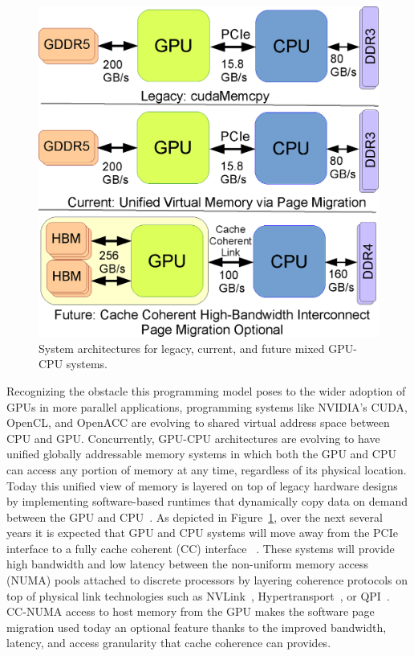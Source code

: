 \begin{figure}[t]
    \centering
    \includegraphics[width=0.7\columnwidth]{hpca2015/figures/architecture.eps}
    \caption{System architectures for legacy, current, and future mixed GPU-CPU systems.}
    \label{fig:arch}
\end{figure}

Recognizing the obstacle this programming model poses to the wider adoption of
GPUs in more parallel applications, programming systems like NVIDIA's CUDA,
OpenCL, and OpenACC are evolving to shared virtual address space between CPU and
GPU. Concurrently, GPU-CPU architectures are evolving to have unified globally
addressable memory systems in which both the GPU and CPU can access any portion
of memory at any time, regardless of its physical location.  Today this unified
view of memory is layered on top of legacy hardware designs by implementing
software-based runtimes that dynamically copy data on demand between the GPU and
CPU~\cite{cuda}. As depicted in Figure~\ref{fig:arch}, over the next several
years it is expected that GPU and CPU systems will move away from the PCIe
interface to a fully cache coherent (CC) interface ~\cite{AMDHSA}. These systems
will provide high bandwidth and low latency between the non-uniform memory
access (NUMA) pools attached to discrete processors by layering coherence
protocols on top of physical link technologies such as NVLink~\cite{NVLINK},
Hypertransport~\cite{AMDHT}, or QPI~\cite{INTELQPI}.   CC-NUMA access to host
memory from the GPU makes the software page migration used today an optional
feature thanks to the improved bandwidth, latency, and access granularity that
cache coherence can provides.

